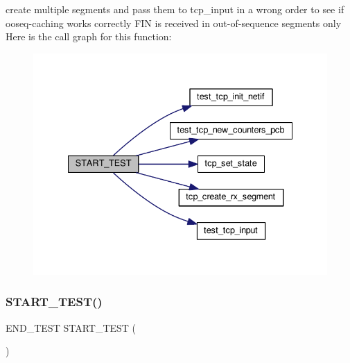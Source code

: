 create multiple segments and pass them to tcp\+\_\+input in a wrong order to see if ooseq-\/caching works correctly F\+IN is received in out-\/of-\/sequence segments only Here is the call graph for this function\+:
\nopagebreak
\begin{figure}[H]
\begin{center}
\leavevmode
\includegraphics[width=335pt]{openmote-cc2538_2lwip_2test_2unit_2tcp_2test__tcp__oos_8c_a06e57221ae3e212e0ce776587a9fc062_cgraph}
\end{center}
\end{figure}
\mbox{\label{openmote-cc2538_2lwip_2test_2unit_2tcp_2test__tcp__oos_8c_a2b7dd8bafcdb6590e1594a1cc1888173}} 
\subsubsection{\texorpdfstring{S\+T\+A\+R\+T\+\_\+\+T\+E\+S\+T()}{START\_TEST()}\hspace{0.1cm}{\footnotesize\ttfamily [2/6]}}
{\footnotesize\ttfamily E\+N\+D\+\_\+\+T\+E\+ST S\+T\+A\+R\+T\+\_\+\+T\+E\+ST (\begin{DoxyParamCaption}\item[{test\+\_\+tcp\+\_\+recv\+\_\+ooseq\+\_\+\+F\+I\+N\+\_\+\+I\+N\+S\+EQ}]{ }\end{DoxyParamCaption})}

